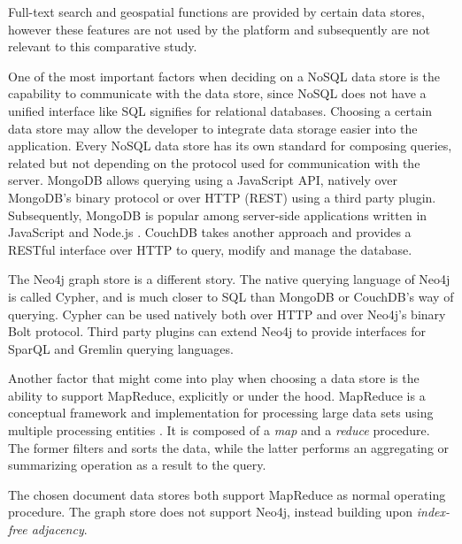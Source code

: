 Full-text search and geospatial functions are provided by certain data stores, however these features are not used by the platform and subsequently are not relevant to this comparative study.\\


\begin{landscape}
  
\end{landscape}

One of the most important factors when deciding on a NoSQL data store is the capability to communicate with the data store, since NoSQL does not have a unified interface like SQL signifies for relational databases.
Choosing a certain data store may allow the developer to integrate data storage easier into the application.
Every NoSQL data store has its own standard for composing queries, related but not depending on the protocol used for communication with the server.
MongoDB allows querying using a JavaScript API, natively over MongoDB's binary protocol or over HTTP (REST) using a third party plugin.
Subsequently, MongoDB is popular among server-side applications written in JavaScript and Node.js \autocite{Dayley2014}.
CouchDB takes another approach and provides a RESTful interface over HTTP to query, modify and manage the database.

The Neo4j graph store is a different story.
The native querying language of Neo4j is called Cypher, and is much closer to SQL than MongoDB or CouchDB's way of querying.
Cypher can be used natively both over HTTP and over Neo4j's binary Bolt protocol.
Third party plugins can extend Neo4j to provide interfaces for SparQL and Gremlin querying languages.

Another factor that might come into play when choosing a data store is the ability to support MapReduce, explicitly or under the hood.
MapReduce is a conceptual framework and implementation for processing large data sets using multiple processing entities \autocite{Dean2008}.
It is composed of a \textit{map} and a \textit{reduce} procedure.
The former filters and sorts the data, while the latter performs an aggregating or summarizing operation as a result to the query.

The chosen document data stores both support MapReduce as normal operating procedure.
The graph store does not support Neo4j, instead building upon \textit{index-free adjacency}.

